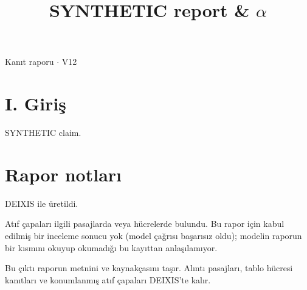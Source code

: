 \documentclass[journal]{IEEEtran}
\begin{document}
\renewcommand{\abstractname}{Özet}
\renewcommand{\IEEEkeywordsname}{Dizin Terimleri}
\renewcommand{\refname}{Kaynaklar}

\title{SYNTHETIC report \& \ensuremath{\alpha}}

\maketitle

\noindent Kanıt raporu \ensuremath{\cdot} V12

\section*{I. Giriş}

SYNTHETIC claim. \cite{Synth26}

\section*{Rapor notları}

DEIXIS ile üretildi.

Atıf çapaları ilgili pasajlarda veya hücrelerde bulundu. Bu rapor için kabul edilmiş bir inceleme sonucu yok (model çağrısı başarısız oldu); modelin raporun bir kısmını okuyup okumadığı bu kayıttan anlaşılamıyor.

Bu çıktı raporun metnini ve kaynakçasını taşır. Alıntı pasajları, tablo hücresi kanıtları ve konumlanmış atıf çapaları DEIXIS'te kalır.




\end{document}
